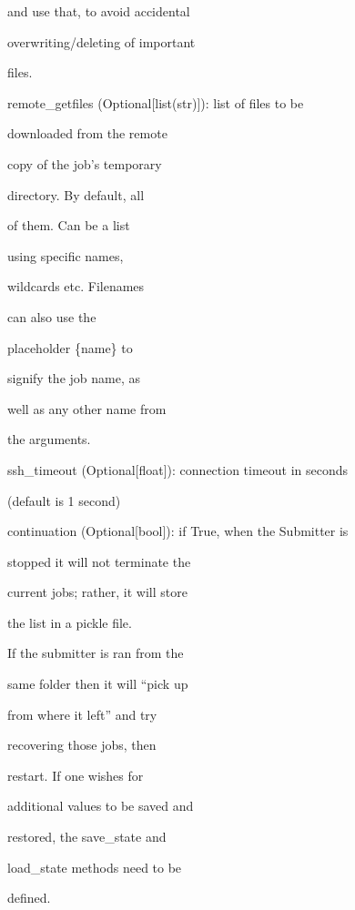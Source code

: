 \documentclass[letterpaper,10pt,english]{sphinxmanual}
\begin{document}
\begin{fulllineitems}
\begin{DUlineblock}{0em}
\begin{DUlineblock}{\DUlineblockindent}
\begin{DUlineblock}{\DUlineblockindent}
\item[] and use that, to avoid accidental
\item[] overwriting/deleting of important
\item[] files.
\end{DUlineblock}
\item[] remote\_getfiles (Optional{[}list(str){]}): list of files to be
\item[]
\begin{DUlineblock}{\DUlineblockindent}
\item[] downloaded from the remote
\item[] copy of the job's temporary
\item[] directory. By default, all
\item[] of them. Can be a list
\item[] using specific names,
\item[] wildcards etc. Filenames
\item[] can also use the
\item[] placeholder \{name\} to
\item[] signify the job name, as
\item[] well as any other name from
\item[] the arguments.
\end{DUlineblock}
\item[] ssh\_timeout (Optional{[}float{]}): connection timeout in seconds
\item[]
\begin{DUlineblock}{\DUlineblockindent}
\item[] (default is 1 second)
\end{DUlineblock}
\item[] continuation (Optional{[}bool{]}): if True, when the Submitter is
\item[]
\begin{DUlineblock}{\DUlineblockindent}
\item[] stopped it will not terminate the
\item[] current jobs; rather, it will store
\item[] the list in a pickle file.
\item[] If the submitter is ran from the
\item[] same folder then it will ``pick up
\item[] from where it left'' and try
\item[] recovering those jobs, then
\item[] restart. If one wishes for
\item[] additional values to be saved and
\item[] restored, the save\_state and
\item[] load\_state methods need to be
\item[] defined.
\end{DUlineblock}
\end{DUlineblock}
\end{DUlineblock}


\end{fulllineitems}
\end{document}
